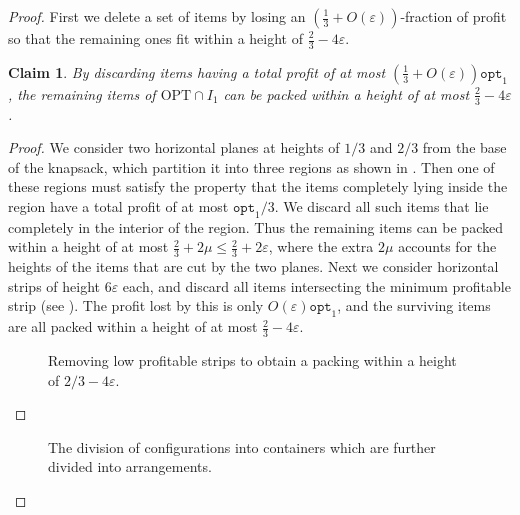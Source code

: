 \documentclass[10pt,a4paper]{amsart}
\newcommand{\eps}{\varepsilon}
\renewcommand{\epsilon}{\varepsilon} %
\newtheorem{claim}[theorem]{Claim}
\theoremstyle{definition}
\newcommand{\opt}{\mathtt{opt}}
\begin{document}
\begin{proof}
    First we delete a set of items by losing an $(\frac{1}{3}+O(\epsilon))$-fraction of profit so that the remaining ones fit within a height of $\frac{2}{3}-4\epsilon$.

\begin{claim}
\label{lem:optspsmall}
     By discarding items having a total profit of at most $\left(\frac{1}{3}+O(\epsilon)\right)\opt_1$, the remaining items of $\text{OPT}\cap I_1$ can be packed within a height of at most $\frac{2}{3}-4\epsilon$.
\end{claim}
\begin{proof}
    We consider two horizontal planes at heights of $1/3$ and $2/3$ from the base of the knapsack, which partition it into three regions as shown in . Then one of these regions must satisfy the property that the items completely lying inside the region have a total profit of at most $\opt_1/3$. We discard all such items that lie completely in the interior of the region. Thus the remaining items can be packed within a height of at most $\frac{2}{3}+2\mu\le \frac{2}{3}+2\epsilon$, where the extra $2\mu$ accounts for the heights of the items that are cut by the two planes. Next we consider horizontal strips of height $6\epsilon$ each, and discard all items intersecting the minimum profitable strip (see ). The profit lost by this is only $O(\epsilon)\opt_1$, and the surviving items are all packed within a height of at most $\frac{2}{3}-4\epsilon$.
    \begin{figure}
    \centering
    
    \caption{Removing low profitable strips to obtain a packing within a height of $2/3-4\eps$.}
    \label{fig:strip-removal}
\end{figure}
\end{proof}
\begin{figure}
    \centering
		
    \caption{The division of configurations into containers which are further divided into arrangements.}
    \label{fig:jp-configurations}
\end{figure}




\end{proof}
\end{document}
